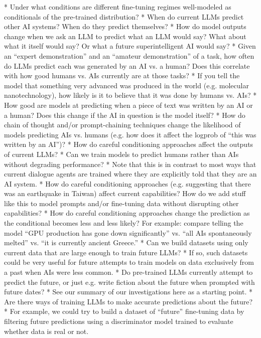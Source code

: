 {{    * Under what conditions are different fine-tuning regimes well-modeled as conditionals of the pre-trained distribution?
* When do current LLMs predict other AI systems? When do they predict themselves?
    * How do model outputs change when we ask an LLM to predict what an LLM would say? What about what it itself would say? Or what a future superintelligent AI would say?
    * Given an ``expert demonstration'' and an ``amateur demonstration'' of a task, how often do LLMs predict each was generated by an AI vs. a human? Does this correlate with how good humans vs. AIs currently are at those tasks?
    * If you tell the model that something very advanced was produced in the world (e.g. molecular nanotechnology), how likely is it to believe that it was done by humans vs. AIs?
    * How good are models at predicting when a piece of text was written by an AI or a human? Does this change if the AI in question is the model itself?
    * How do chain of thought and/or prompt-chaining techniques change the likelihood of models predicting AIs vs. humans (e.g. how does it affect the logprob of ``this was written by an AI'')?
* How do careful conditioning approaches affect the outputs of current LLMs?
    * Can we train models to predict humans rather than AIs without degrading performance?
        * Note that this is in contrast to most ways that current dialogue agents are trained where they are explicitly told that they are an AI system.
    * How do careful conditioning approaches (e.g. suggesting that there was an earthquake in Taiwan) affect current capabilities? How do we add stuff like this to model prompts and/or fine-tuning data without disrupting other capabilities?
    * How do careful conditioning approaches change the prediction as the conditional becomes less and less likely? For example: compare telling the model ``GPU production has gone down significantly'' vs. ``all AIs spontaneously melted'' vs. ``it is currently ancient Greece.''
* Can we build datasets using only current data that are large enough to train future LLMs?
    * If so, such datasets could be very useful for future attempts to train models on data exclusively from a past when AIs were less common.
* Do pre-trained LLMs currently attempt to predict the future, or just e.g. write fiction about the future when prompted with future dates?
    * See our summary of our investigations here\cite{TODO: cite TODO} as a starting point.
    * Are there ways of training LLMs to make accurate predictions about the future?
        * For example, we could try to build a dataset of ``future'' fine-tuning data by filtering future predictions using a discriminator model trained to evaluate whether data is real or not.
}}
